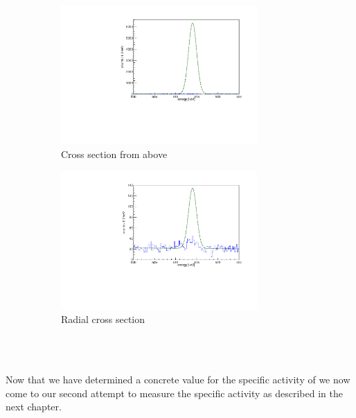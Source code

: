 \begin{figure}[t!]
	\centering
	\begin{subfigure}{.5\textwidth}
		\centering
		\includegraphics[width=75mm]{./Bilder/WARP.pdf}
		\caption{Cross section from above}
		\label{fig:WARP}
	\end{subfigure}%
	\begin{subfigure}{.5\textwidth}
		\centering
		\includegraphics[width=75mm]{./Bilder/Darkside.pdf}
		\caption{Radial cross section}
		\label{fig:Darkside}
	\end{subfigure}
    \\
	\vspace{0.5cm}
    \caption{}
\vspace{0.5cm}
\end{figure}
\\

Now that we have determined a concrete value for the specific activity of \Kr we now come to our second attempt to measure the specific activity as described in the next chapter.
\\  








